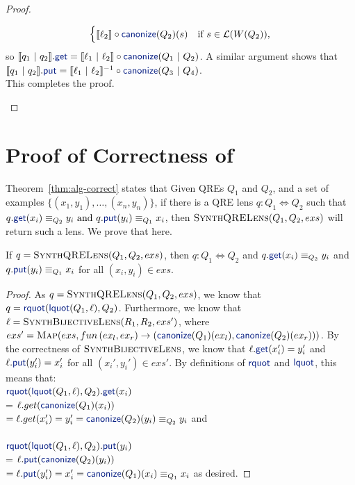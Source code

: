 \documentclass[acmsmall,review,anonymous]{acmart}
\newcommand{\kw}[1]{\textcolor{dkblue}{\ensuremath{\mathsf{#1}}}}
\newcommand{\sep}{\ensuremath{\ | \ }}
\newcommand{\canonize}{\ensuremath{\kw{canonize}}}
\newcommand{\get}{\ensuremath{\kw{get}}}
\newcommand{\lput}{\ensuremath{\kw{put}}}
\newcommand{\lquot}{\ensuremath{\kw{lquot}}}
\newcommand{\rquot}{\ensuremath{\kw{rquot}}}
\begin{document}
\begin{proof}
\begin{enumerate}
$$\begin{cases}
\llbracket \ell_2 \rrbracket \circ
\canonize(Q_2) (s) & \text{if } s \in \mathcal{L}(W(Q_2)),\\
\end{cases}$$
so $\llbracket q_1 \sep q_2 \rrbracket.\get = \llbracket \ell_1 \sep
\ell_2 \rrbracket \circ \canonize(Q_1 \sep Q_2)$. A similar argument shows
that $\llbracket q_1 \sep q_2 \rrbracket.\lput = \llbracket \ell_1 \sep
\ell_2 \rrbracket^{-1} \circ \canonize(Q_3 \sep Q_4)$.\\
This completes the proof. 
\end{enumerate}
\end{proof}

\section{Proof of Correctness of }
Theorem~\ref{thm:alg-correct} states that
  Given QREs $Q_1$ and $Q_2$, and a set of examples
  $\{(x_1,y_1),\ldots,(x_n,y_n)\}$, if there is a QRE lens $q : Q_1
  \Leftrightarrow Q_2$ such that $q.\get(x_i) \equiv_{Q_2} y_i \text{ and }
q.\lput(y_i) \equiv_{Q_1} x_i$, then $\textproc{SynthQRELens}(Q_1,Q_2,exs)$ will
return such a lens.  We prove that here.

\begin{lemma}
  If $q = \textproc{SynthQRELens}(Q_1,Q_2,exs)$, then $q : Q_1 \Leftrightarrow
  Q_2$ and $q.\get(x_i) \equiv_{Q_2} y_i$  and 
$q.\lput(y_i) \equiv_{Q_1} x_i$ for all $(x_i,y_i)\in exs$.
\end{lemma}
\begin{proof}
  As $q = \textproc{SynthQRELens}(Q_1,Q_2,exs)$, we know that $q =
  \rquot(\lquot(Q_1, \ell), Q_2)$. Furthermore, we know that $\ell =
  \Call{SynthBijectiveLens}{R_1,R_2,exs'}$, where $exs' = \Call{Map}{exs,fun \,
    (ex_l,ex_r) \to (\canonize(Q_1)(ex_l),\canonize(Q_2)(ex_r))}$. By the
    correctness of $\textproc{SynthBijectiveLens}$, we know that
    $\ell.\get(x_i') = y_i'$ and $\ell.\lput(y_i') = x_i'$ for all
    $(x_i',y_i')\in exs'$. By definitions of $\rquot$ and $\lquot$, this means
    that:\\
$\rquot(\lquot(Q_1, \ell),
  Q_2).\get(x_i)$\\
 = $\ell.get(\canonize(Q_1)(x_i))$\\ $= \ell.get(x_i') = y_i' =
  \canonize(Q_2)(y_i) \equiv_{Q_2} y_i$ and\\
\\
$\rquot(\lquot(Q_1, \ell),
  Q_2).\lput(y_i)$\\
 = $\ell.\lput(\canonize(Q_2)(y_i))$\\ $= \ell.\lput(y_i') = x_i' =
  \canonize(Q_1)(x_i) \equiv_{Q_1} x_i$ as desired.
\end{proof}
\end{document}
